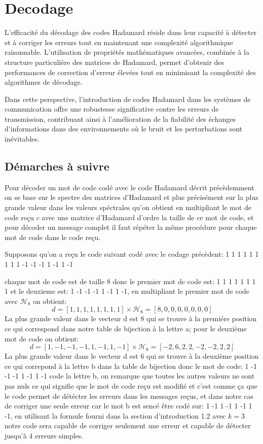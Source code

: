 \documentclass{article}
\begin{document}
\section{Decodage}

L'efficacité du décodage des codes Hadamard réside dans leur capacité à 
détecter et à corriger les erreurs tout en maintenant une complexité 
algorithmique raisonnable. L'utilisation de propriétés mathématiques 
avancées, combinée à la structure particulière des matrices de Hadamard, 
permet d'obtenir des performances de correction d'erreur élevées tout en 
minimisant la complexité des algorithmes de décodage.

Dans cette perspective, l'introduction de codes Hadamard dans les systèmes 
de communication offre une robustesse significative contre les erreurs de 
transmission, contribuant ainsi à l'amélioration de la fiabilité des 
échanges d'informations dans des environnements où le bruit et les 
perturbations sont inévitables.

\subsection{Démarches à suivre}
Pour décoder un mot de code codé avec le code Hadamard décrit précèdemment on se base sur
le spectre des matrices d'Hadamard et plus précisément sur la plus grande valeur dans les 
valeurs spéctrales qu'on obtient en multipliant le mot de code reçu $c$ avec une matrice 
d'Hadamard d'ordre la taille de ce mot de code, et pour décoder un message complet il faut
répéter la même procédure pour chaque mot de code dans le code reçu.

Supposons qu'on a reçu le code suivant codé avec le codage précèdent:
1 1 1 1 1 1 1 1 1 -1 -1 -1 1 -1 1 -1 

chaque mot de code est de taille 8 donc le premier mot de code est: 1 1 1 1 1 1 1 1 et le 
deuxieme est: 1 -1 -1 -1 1 -1 1 -1, en multipliant le premier mot de code avec 
$\mathcal{H}_8$ on obtient:
\begin{equation*}
	d = [1, 1, 1, 1, 1, 1, 1, 1] \times \mathcal{H}_8 = [8, 0, 0, 0, 0, 0, 0, 0]
\end{equation*}
La plus grande valeur dans le vecteur d est 8 qui se trouve à la premiére position ce qui 
correspond dans notre table de bijection à la lettre a; pour le deuxième mot de code on 
obtient:
\begin{equation*}
	d = [1, -1, -1, -1, 1, -1, 1, -1] \times \mathcal{H}_8 = [-2, 6, 2, 2, -2, -2, 2, 2]
\end{equation*}
La plus grande valeur dans le vecteur d est 6 qui se trouve à la deuxième position ce qui 
correpond à la lettre b dans la table de bijection donc le mot de code: 
1 -1 -1 -1 1 -1 1 -1 code la lettre b, on remarque que toutes les autres valeurs ne sont 
pas nuls ce qui signifie que le mot de code reçu est modifié et c'est comme ça que le code
permet de détécter les erreurs dans les messages reçus, et dans notre cas de corriger 
une seule erreur car le mot b est sencé être codé sur: 1 -1 1 -1 1 -1 1 -1, en utilisant la
formule fourni dans la section d'introduction 1.2 avec $k=3$ notre code sera capable de 
corriger seulement une erreur et capable de détecter jusqu'à 4 erreurs simples.
\newpage
\end{document}
